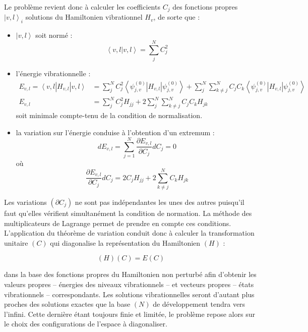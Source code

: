\documentclass[12pt,a4paper]{book}
\begin{document}
Le problème revient donc à calculer les coefficients $C_j$ des fonctions propres $\left|v,l\right\rangle_i$ solutions du Hamiltonien vibrationnel $H_v$, de sorte que :

\begin{itemize}
	\item $\left|v,l\right\rangle$ soit normé : 
	\begin{equation}
	\left\langle v,l\right|\left. v ,l\right\rangle = \sum^N_j C^2_j
	\end{equation}
	\item l'énergie vibrationnelle : 
	\begin{align}
	E_{v,l} = \left\langle v,l\right. \left|H_{v,l}\right|\left. v,l\right\rangle &= \sum^N_j C^2_j \left\langle \psi^{(0)}_{j,v}\right. \left|H_{v,l}\right|\left. \psi^{(0)}_{j,v}\right\rangle + \sum^N_j \sum^N_{k\neq j}C_jC_k \left\langle \psi^{(0)}_{j,v}\right. \left|H_{v,l}\right|\left. \psi^{(0)}_{j,v}\right\rangle \\
	E_{v,l} &= \sum^N_j C^2_j H_{jj} + 2 \sum^N_j \sum^N_{k\neq j} C_jC_k H_{jk}
	\end{align}
	\noindent soit minimale compte-tenu de la condition de normalisation.
	\item la variation sur l'énergie conduise à l'obtention d'un extremum : 
	\begin{equation}
	dE_{v,l} = \sum^N_{j=1} \frac{\partial E_{v,l}}{\partial C_j}dC_j = 0 	
	\end{equation}
	\noindent où
	\begin{equation}
	\frac{\partial E_{v,l}}{\partial C_j}dC_j = 2C_jH_{jj} + 2\sum^N_{k\neq j} C_kH_{jk}
	\end{equation}
\end{itemize}


Les variations $(\partial C_j)$ ne sont pas indépendantes les unes des autres puisqu'il faut qu'elles vérifient simultanément la condition de normation. La méthode des multiplicateurs de Lagrange permet de prendre en compte ces conditions. L'application du théorème de variation conduit donc à calculer la transformation unitaire $(C)$ qui diagonalise la représentation du Hamiltonien $(H)$ :

\begin{equation}
(H)(C) = E (C)
\end{equation}

\noindent dans la base des fonctions propres du Hamiltonien non perturbé afin d'obtenir les valeurs propres -- énergies des niveaux vibrationnels -- et vecteurs propres -- états vibrationnels -- correspondants. Les solutions vibrationnelles seront d'autant plus proches des solutions exactes que la base $(N)$ de développement tendra vers l'infini. Cette dernière étant toujours finie et limitée, le problème repose alors sur le choix des configurations de l'espace à diagonaliser.
\end{document}
